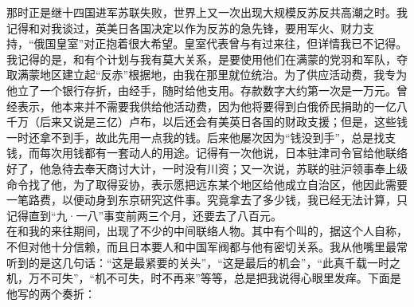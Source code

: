 那时正是继十四国进军苏联失败，世界上又一次出现大规模反苏反共高潮之时。我记得和对我谈过，英美日各国决定以作为反苏的急先锋，要用军火、财力支持，“俄国皇室”对正抱着很大希望。皇室代表曾与有过来往，但详情我已不记得。我记得的是，和有个计划与我有莫大关系，是要使用他们在满蒙的党羽和军队，夺取满蒙地区建立起“反赤”根据地，由我在那里就位统治。为了供应活动费，我专为他立了一个银行存折，由经手，随时给他支用。存款数字大约第一次是一万元。曾经表示，他本来并不需要我供给他活动费，因为他将要得到白俄侨民捐助的一亿八千万（后来又说是三亿）卢布，以后还会有美英日各国的财政支援；但是，这些钱一时还拿不到手，故此先用一点我的钱。后来他屡次因为“钱没到手”，总是找支钱，而每次用钱都有一套动人的用途。记得有一次他说，日本驻津司令官给他联络好了，他急待去奉天商讨大计，一时没有川资；又一次说，苏联的驻沪领事奉上级命令找了他，为了取得妥协，表示愿把远东某个地区给他成立自治区，他因此需要一笔路费，以便动身到东京研究这件事。究竟拿去了多少钱，我已经无法计算，只记得直到“九·一八”事变前两三个月，还要去了八百元。\\

在和我的来往期间，出现了不少的中间联络人物。其中有个叫的，据这个人自称，不但对他十分信赖，而且日本要人和中国军阀都与他有密切关系。我从他嘴里最常听到的是这几句话：“这是最紧要的关头”，“这是最后的机会”，“此真千载一时之机，万不可失”，“机不可失，时不再来”等等，总是把我说得心眼里发痒。下面是他写的两个奏折：\\


